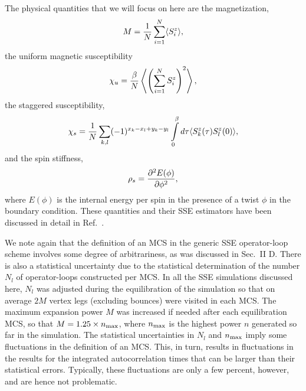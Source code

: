 \documentclass[10pt,pre,aps,twocolumn,showpacs,superscriptaddress,
floatfix]{revtex4}
\begin{document}
The physical quantities that we will focus on here are the magnetization, 
\begin{equation}
M = {1\over N} \sum_{i=1}^N \langle S^z_i \rangle,
\end{equation}
the uniform magnetic susceptibility
\begin{equation}
\chi_u = {\beta\over N} \left \langle \left ( \sum_{i=1}^N S^z_i \right )^2
\right \rangle ,
\end{equation}
the staggered susceptibility,
\begin{equation}
\chi_s = {1\over N} \sum\limits_{k,l}(-1)^{x_k-x_l+y_k-y_l}
\int\limits_0^\beta d\tau \langle S^z_k (\tau)S^z_l (0) \rangle ,
\label{chisdef}
\end{equation}
and the spin stiffness, 
\begin{equation}
\rho_s = {\partial^2 E(\phi)\over \partial\phi ^2},
\end{equation}
where $E(\phi)$ is the internal energy per spin in the presence of
a twist $\phi$ in the boundary condition. These quantities and their SSE
estimators have been discussed in detail in Ref.~\cite{sse4}.

We note again that the definition of an MCS in the generic SSE operator-loop 
scheme involves some degree of arbitrariness, as was discussed in Sec.~II D. 
There is also a statistical uncertainty due to the statistical determination 
of the number $N_l$ of operator-loops constructed per MCS. In all the SSE
simulations discussed here, $N_l$ was adjusted during the equilibration of 
the simulation so that on average $2M$ vertex legs (excluding bounces)
were visited in each MCS. The maximum expansion power $M$ was increased if 
needed after each equilibration MCS, so that $M = 1.25 \times n_{\rm max}$, 
where $n_{\rm max}$ is the highest power $n$ generated so far in the 
simulation. The statistical uncertainties in $N_l$ and $n_{\rm max}$ imply 
some fluctuations in the definition of an MCS. This, in turn, results in 
fluctuations in the results for the integrated autocorrelation times that can 
be larger than their statistical errors. Typically, these fluctuations are 
only a few percent, however, and are hence not problematic. 
\end{document}
